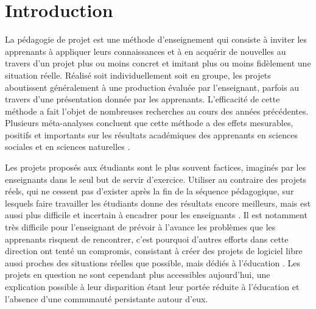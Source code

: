 \documentclass[dvipsnames,runningheads]{llncs}
\begin{document}

    \section{Introduction}

    La pédagogie de projet est une méthode d'enseignement qui consiste à inviter les apprenants à appliquer
    leurs connaissances et à en acquérir de nouvelles au travers d'un projet plus ou moins concret et imitant
    plus ou moins fidèlement une situation réelle. Réalisé soit individuellement soit en groupe, les projets
    aboutissent généralement à une production évaluée par l'enseignant, parfois au travers d'une présentation
    donnée par les apprenants. L'efficacité de cette méthode a fait l'objet de nombreuses recherches au cours
    des années précédentes. Plusieurs méta-analyses concluent que cette méthode a des effets mesurables,
    positifs et importants sur les résultats académiques des apprenants en sciences sociales et en sciences
    naturelles \cite{pbl-2019, pbl-2018}.

    Les projets proposés aux étudiants sont le plus souvent factices, imaginés par les enseignants dans le
    seul but de servir d'exercice. Utiliser au contraire des projets réels, qui ne cessent pas d'exister après
    la fin de la séquence pédagogique, sur lesquels faire travailler les étudiants donne des résultats encore
    meilleurs, mais est aussi plus difficile et incertain à encadrer pour les enseignants \cite{real-pbl-2010,
    real-pbl-2004}. Il est notamment très difficile pour l'enseignant de prévoir à l'avance les problèmes que
    les apprenants risquent de rencontrer, c'est pourquoi d'autres efforts dans cette direction ont tenté un
    compromis, consistant à créer des projets de logiciel libre aussi proches des situations réelles que
    possible, mais dédiés à l'éducation \cite{oss-edu-2008}. Les projets en question ne sont cependant plus
    accessibles aujourd'hui, une explication possible à leur disparition étant leur portée réduite à
    l'éducation et l'absence d'une communauté persistante autour d'eux.
\end{document}

